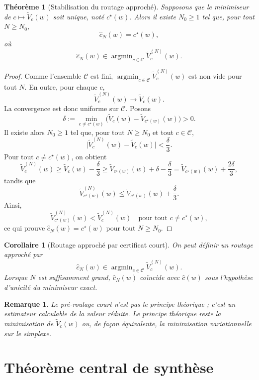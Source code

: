 \documentclass[11pt,a4paper]{article}
\newtheorem{theorem}{Théorème}[section]
\newtheorem{corollary}{Corollaire}[section]
\newtheorem{remark}{Remarque}[section]
\DeclareMathOperator{\argmin}{argmin}
\newcommand{\Ccal}{\mathcal C}
\begin{document}
\begin{theorem}[Stabilisation du routage approché]
Supposons que le minimiseur de \(c\mapsto \widetilde V_c(w)\) soit unique, noté \(c^\star(w)\). Alors il existe \(N_0\ge 1\) tel que, pour tout \(N\ge N_0\),
\[
\hat c_N(w)=c^\star(w),
\]
où
\[
\hat c_N(w)\in\argmin_{c\in\Ccal}\widetilde V_c^{(N)}(w).
\]
\end{theorem}

\begin{proof}
Comme l'ensemble \(\Ccal\) est fini, \(\argmin_{c\in\Ccal}\widetilde V_c^{(N)}(w)\) est non vide pour tout \(N\). En outre, pour chaque \(c\),
\[
\widetilde V_c^{(N)}(w)\to \widetilde V_c(w).
\]
La convergence est donc uniforme sur \(\Ccal\). Posons
\[
\delta:=\min_{c\neq c^\star(w)}\bigl(\widetilde V_c(w)-\widetilde V_{c^\star(w)}(w)\bigr)>0.
\]
Il existe alors \(N_0\ge 1\) tel que, pour tout \(N\ge N_0\) et tout \(c\in\Ccal\),
\[
\bigl|\widetilde V_c^{(N)}(w)-\widetilde V_c(w)\bigr|<\frac{\delta}{3}.
\]
Pour tout \(c\neq c^\star(w)\), on obtient
\[
\widetilde V_c^{(N)}(w)
\ge
\widetilde V_c(w)-\frac{\delta}{3}
\ge
\widetilde V_{c^\star(w)}(w)+\delta-\frac{\delta}{3}
=
\widetilde V_{c^\star(w)}(w)+\frac{2\delta}{3},
\]
tandis que
\[
\widetilde V_{c^\star(w)}^{(N)}(w)
\le
\widetilde V_{c^\star(w)}(w)+\frac{\delta}{3}.
\]
Ainsi,
\[
\widetilde V_{c^\star(w)}^{(N)}(w)<\widetilde V_c^{(N)}(w)
\quad\text{pour tout } c\neq c^\star(w),
\]
ce qui prouve \(\hat c_N(w)=c^\star(w)\) pour tout \(N\ge N_0\).
\end{proof}

\begin{corollary}[Routage approché par certificat court]
On peut définir un routage approché par
\[
\hat c_N(w)\in\argmin_{c\in\Ccal}\widetilde V_c^{(N)}(w).
\]
Lorsque \(N\) est suffisamment grand, \(\hat c_N(w)\) coïncide avec \(\hat c(w)\) sous l'hypothèse d'unicité du minimiseur exact.
\end{corollary}

\begin{remark}
Le pré-roulage court n'est pas le principe théorique ; c'est un estimateur calculable de la valeur réduite. Le principe théorique reste la minimisation de \(\widetilde V_c(w)\) ou, de façon équivalente, la minimisation variationnelle sur le simplexe.
\end{remark}

\section{Théorème central de synthèse}
\end{document}
